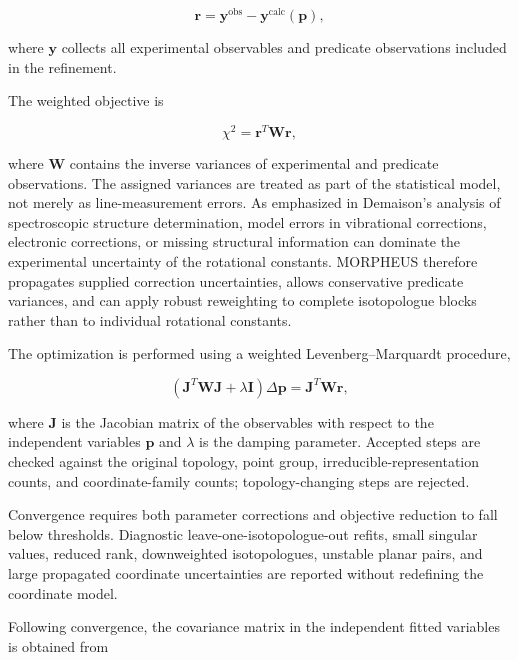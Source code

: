 \documentclass[aip,jcp,reprint,longbibliography,floatfix]{revtex4-2}
\begin{document}
\begin{equation}
\mathbf{r}
= \mathbf{y}^{\mathrm{obs}}
- \mathbf{y}^{\mathrm{calc}}(\mathbf{p}),
\end{equation}

where $\mathbf{y}$ collects all experimental observables and predicate
observations included in the refinement.

The weighted objective is

\begin{equation}
\chi^2
=
\mathbf{r}^{T}
\mathbf{W}
\mathbf{r},
\end{equation}

where $\mathbf{W}$ contains the inverse variances of experimental and predicate
observations. The assigned variances are treated as part of the statistical
model, not merely as line-measurement errors. As emphasized in Demaison's
analysis of spectroscopic structure determination,\cite{Demaison2007EquilibriumReview}
model errors in vibrational corrections, electronic corrections, or missing
structural information can dominate the experimental uncertainty of the
rotational constants. MORPHEUS therefore propagates supplied correction
uncertainties, allows conservative predicate variances, and can apply robust
reweighting to complete isotopologue blocks rather than to individual
rotational constants.

The optimization is performed using a weighted Levenberg--Marquardt procedure,

\begin{equation}
\left(
\mathbf{J}^{T}
\mathbf{W}
\mathbf{J}
+
\lambda \mathbf{I}
\right)
\Delta \mathbf{p}
=
\mathbf{J}^{T}
\mathbf{W}
\mathbf{r},
\label{eq:lm-step}
\end{equation}

where $\mathbf{J}$ is the Jacobian matrix of the observables with respect to
the independent variables $\mathbf{p}$ and $\lambda$ is the damping parameter.
Accepted steps are checked against the original topology, point group,
irreducible-representation counts, and coordinate-family counts; topology-changing
steps are rejected.

Convergence requires both parameter corrections and objective reduction to fall
below thresholds. Diagnostic leave-one-isotopologue-out refits, small singular
values, reduced rank, downweighted isotopologues, unstable planar pairs, and
large propagated coordinate uncertainties are reported without redefining the
coordinate model.

Following convergence, the covariance matrix in the independent fitted
variables is obtained from
\end{document}
